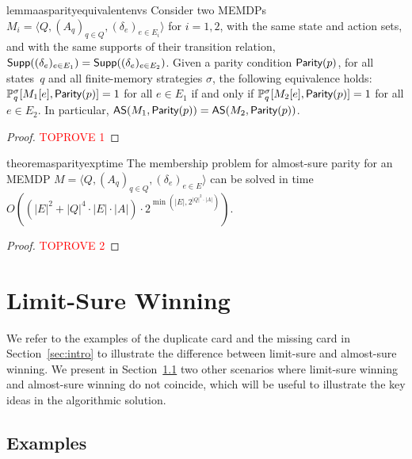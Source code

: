 \documentclass[a4paper,USenglish,cleveref, autoref, thm-restate]{lipics-v2021}
\def\abs#1{\ensuremath{\lvert #1 \rvert}}
\newcommand{\tuple}[1]{\langle #1 \rangle}
\newcommand*{\pr}{\mathbb{P}}
\newcommand\Supp{\textrm{\sf Supp}}
\newcommand\almostsure{\textrm{\sf AS}}
\newcommand\Parity{\textrm{\sf Parity}}
\newcommand\straa{\sigma}
\begin{document}
\begin{restatable}{lemma}{asparityequivalentenvs}
	\label{lemma:as-parity-equivalent-envs}
	Consider two MEMDPs $M_i = \tuple{Q, (A_q)_{q \in Q}, (\delta_e)_{e \in E_i}}$ for $i=1,2$,	
	with the same state and action sets, and with the same supports of their
	transition relation, $\Supp((\delta_e)_{e \in E_1}) = \Supp((\delta_e)_{e \in E_2})$. 
	Given a parity condition $\Parity(p)$, for all states~$q$ and all finite-memory strategies $\straa$, 
	the following equivalence holds:
	$\pr_{q}^{\straa}[M_1[e], \Parity(p)] = 1$ for all $e\in E_1$ if and only if 
	$\pr_{q}^{\straa}[M_2[e], \Parity(p)] = 1$ for all $e\in E_2$.
	In particular, $\almostsure(M_1, \Parity(p)) = \almostsure(M_2, \Parity(p))$. 
\end{restatable}

\begin{proof}\textcolor{red}{TOPROVE 1}\end{proof}

\begin{restatable}{theorem}{asparityexptime}
	\label{th:as-parity-exptime}
	The membership problem for almost-sure parity for an MEMDP
	$M = \tuple{Q, (A_q)_{q \in Q}, (\delta_e)_{e \in E}}$
	can be solved in time 
    $O((\abs{E}^2+\abs{Q}^4\cdot\abs{E}\cdot\abs{A})\cdot2^{\min(\abs{E}, 2^{\abs{Q}^2\cdot\abs{A}})})$.
\end{restatable}


\begin{proof}\textcolor{red}{TOPROVE 2}\end{proof}



\section{Limit-Sure Winning}\label{section:limitsure}
We refer to the examples of the duplicate card and the missing card in Section~\ref{sec:intro} to illustrate the
difference between limit-sure and almost-sure winning. We present in Section~\ref{sec:example-as-ls} two other scenarios where limit-sure winning and almost-sure winning do not coincide, which will be useful to illustrate the key ideas in the algorithmic solution.

\subsection{Examples}\label{sec:example-as-ls}
\end{document}
